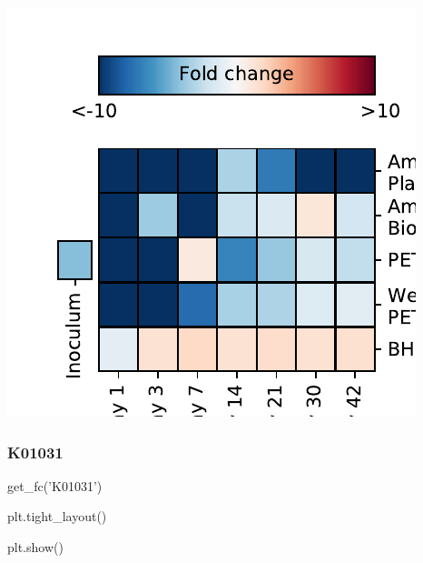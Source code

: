 \documentclass[
]{article}
\newenvironment{Shaded}{\begin{snugshade}}{\end{snugshade}}
\newcommand{\NormalTok}[1]{#1}
\newcommand{\StringTok}[1]{\textcolor[rgb]{0.31,0.60,0.02}{#1}}
\begin{document}
\includegraphics{20-6-15-PET-plastisphere-PICRUSt2_files/figure-latex/plot_fc_K01055-1.pdf}

\hypertarget{k01031-1}{%
\subsubsection{K01031}\label{k01031-1}}

\begin{Shaded}
\begin{Highlighting}[]
\NormalTok{get_fc(}\StringTok{'K01031'}\NormalTok{)}
\end{Highlighting}
\end{Shaded}

\begin{Shaded}
\begin{Highlighting}[]
\NormalTok{plt.tight_layout()}
\end{Highlighting}
\end{Shaded}

\begin{Shaded}
\begin{Highlighting}[]
\NormalTok{plt.show()}
\end{Highlighting}
\end{Shaded}
\end{document}
